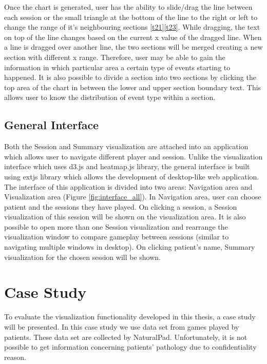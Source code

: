 \documentclass{vgtc}                          %
\begin{document}
Once the chart is generated, user has the ability to slide/drag the line between each session or the small triangle at the bottom of the line to the right or left to change the range of it's neighbouring sections \ref{t21}\ref{t23}. While dragging, the text on top of the line changes based on the current x value of the dragged line. When a line is dragged over another line, the two sections will be merged creating a new section with different x range. Therefore, user may be able to gain the information in which particular area a certain type of events starting to happened. It is also possible to divide a section into two sections by clicking the top area of the chart in between the lower and upper section boundary text. This allows user to know the distribution of event type within a section.

\subsection{General Interface}

Both the Session and Summary visualization are attached into an application which allows user to navigate different player and session. Unlike the visualization interface which uses d3.js and heatmap.js library, the general interface is built using extjs library which allows the development of desktop-like web application. The interface of this application is divided into two areas: Navigation area and Visualization area (Figure \ref{fig:interface_all}). In Navigation area, user can choose patient and the sessions they have played. On clicking a session, a Session visualization of this session will be shown on the visualization area. It is also possible to open more than one Session visualization and rearrange the visualization window to compare gameplay between sessions (similar to navigating multiple windows in desktop). On clicking patient's name, Summary visualization for the chosen session will be shown.

\section{Case Study}

To evaluate the visualization functionality developed in this thesis, a case study will be presented. In this case study we use data set from games played by patients. These data set are collected by NaturalPad. Unfortunately, it is not possible to get information concerning patients' pathology due to confidentiality reason. 
\end{document}
